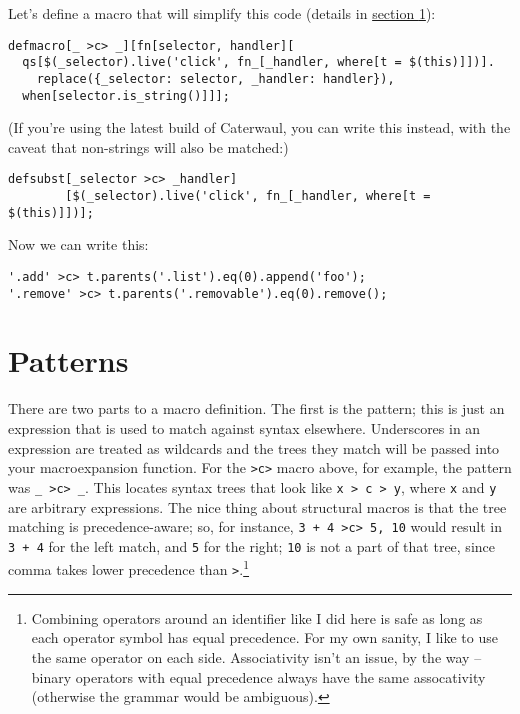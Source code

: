 \documentclass{report}
\newcommand{\Ref}[2]{\hyperref[#2]{#1 \ref*{#2}}}
\begin{document}
  Let's define a macro that will simplify this code (details in \Ref{section}{sec:defining-macros-patterns}):

\begin{verbatim}
defmacro[_ >c> _][fn[selector, handler][
  qs[$(_selector).live('click', fn_[_handler, where[t = $(this)]])].
    replace({_selector: selector, _handler: handler}),
  when[selector.is_string()]]];
\end{verbatim}

  (If you're using the latest build of Caterwaul, you can write this instead, with the caveat that non-strings will also be matched:)

\begin{verbatim}
defsubst[_selector >c> _handler]
        [$(_selector).live('click', fn_[_handler, where[t = $(this)]])];
\end{verbatim}

  Now we can write this:

\begin{verbatim}
'.add' >c> t.parents('.list').eq(0).append('foo');
'.remove' >c> t.parents('.removable').eq(0).remove();
\end{verbatim}

\section{Patterns}\label{sec:defining-macros-patterns}
    There are two parts to a macro definition. The first is the pattern; this is just an expression that is used to match against syntax elsewhere. Underscores in an expression are treated as
    wildcards and the trees they match will be passed into your macroexpansion function. For the \verb|>c>| macro above, for example, the pattern was \verb|_ >c> _|. This locates syntax trees
    that look like \verb|x > c > y|, where {\tt x} and {\tt y} are arbitrary expressions. The nice thing about structural macros is that the tree matching is precedence-aware; so, for
    instance, \verb|3 + 4 >c> 5, 10| would result in \verb|3 + 4| for the left match, and \verb|5| for the right; \verb|10| is not a part of that tree, since comma takes lower precedence than
    \verb|>|.\footnote{Combining operators around an identifier like I did here is safe as long as each operator symbol has equal precedence. For my own sanity, I like to use the same operator
    on each side. Associativity isn't an issue, by the way -- binary operators with equal precedence always have the same assocativity (otherwise the grammar would be ambiguous).}
\end{document}
